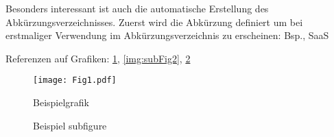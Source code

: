 Besonders interessant ist auch die automatische Erstellung des Abkürzungsverzeichnisses. Zuerst wird die Abkürzung definiert um bei erstmaliger Verwendung im Abkürzungsverzeichnis zu erscheinen: \ac{Bsp.}, \ac{SaaS}

Referenzen auf Grafiken: \ref{fig:Fig1}, \ref{img:subFig2}, \ref{img:subFigs}

\begin{figure}
  \centering
  \texttt{[image: Fig1.pdf]}
  \caption{Beispielgrafik}
  \label{fig:Fig1}
\end{figure}


\begin{figure}
  \centering
  \hfill
  \hfill
  \caption{Beispiel subfigure}
  \label{img:subFigs}
\end{figure}



\lstset{language=JAVA, breaklines=true, tabsize=2}



